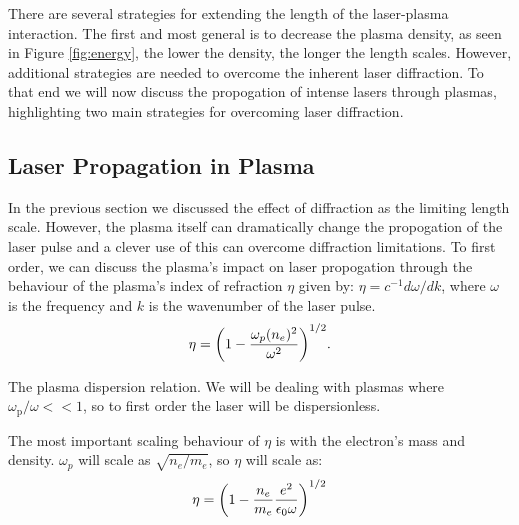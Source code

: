 \documentclass[12pt,letter]{article}
\begin{document}
    There are several strategies for extending the length of the laser-plasma
    interaction. The first and most general is to decrease the plasma
    density, as seen in  Figure \ref{fig:energy}, the lower the
    density, the longer the length scales. However, additional strategies
    are needed to overcome the inherent laser diffraction. To that end we will
    now discuss the propogation of
    intense lasers through plasmas, highlighting two main strategies
    for overcoming laser diffraction.

    \subsection{Laser Propagation in Plasma}
   In the previous section we discussed the effect of diffraction as the
   limiting length scale. However, the plasma
   itself can dramatically change the propogation of the laser pulse and a
   clever use of this can overcome diffraction limitations. To first order, we can
   discuss the plasma's impact on laser propogation through the
   behaviour of the plasma's index of refraction $\eta$ given by:
   $\eta = c^{-1}d \omega / d k $,
   where $\omega$ is the frequency and $k$ is the wavenumber of the laser
   pulse. 
   \begin{equation}
    \label{eq:index}
    \eta = \qty(1-\frac{\omega_p(n_e)^2}{\omega^2})^{1/2}.
\end{equation}
\begin{marginfigure}
    \caption{\label{fig:dispersion}The plasma dispersion relation. We will be
        dealing with plasmas where $\omega_\mathrm{p}/\omega << 1$, so to
    first order the laser will be dispersionless. }
    \end{marginfigure}

The most important scaling behaviour of $\eta$ is with the electron's mass and
density. $\omega_p$ will scale as $\sqrt{n_e/m_e}$, so $\eta$ will scale as:
\begin{equation}
    \label{eq:etascale}
    \eta = \qty(1-\frac{n_e}{m_e}\frac{e^2}{\epsilon_0 \omega})^{1/2}
\end{equation}
\end{document}
